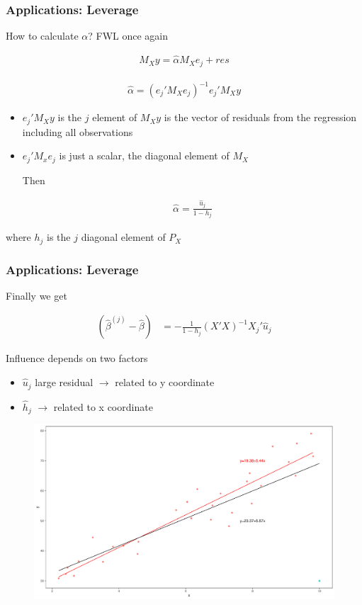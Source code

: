 \documentclass[
  shownotes,
  xcolor={svgnames},
  hyperref={colorlinks,citecolor=DarkBlue,linkcolor=DarkRed,urlcolor=DarkBlue}
  , aspectratio=169]{beamer}
\begin{document}
\begin{frame}
\frametitle{Applications: Leverage}
How to calculate $\alpha$? FWL once again

\begin{align}
M_X y =\hat\alpha M_X e_j + res
\end{align}

\begin{align}
\hat\alpha = (e_j'M_X e_j)^{-1}  e_j'M_X y  
\end{align}

\begin{itemize}
\item $e_j'M_X y $ is the $j$ element of $M_Xy$ is the vector of residuals from the regression including all observations
\item $e_j'M_xe_j$ is just a scalar, the diagonal element of $M_X$

Then 

\begin{align}
\hat\alpha = \frac{\hat u_j}{1-h_j}
\end{align}
\end{itemize}

where $h_j$ is the $j$ diagonal element of $P_X$


\end{frame}
\begin{frame}
\frametitle{Applications: Leverage}
Finally we get 

\begin{align}
  (\hat \beta^{(j)} - \hat \beta)&= - \frac{1}{1-h_j} (X'X)^{-1}X_j'\hat u_j
\end{align}

Influence depends on two factors
\begin{itemize}
  \item $\hat u_j$ large residual $\rightarrow$ related to y coordinate
  \item $\hat h_j$  $\rightarrow$ related to x coordinate
\end{itemize}

\begin{figure}[H] \centering
  \centering
  \includegraphics[scale=0.15]{figures/fig_1d.pdf}
  \\
  \tiny
\end{figure}
\end{frame}
\end{document}

